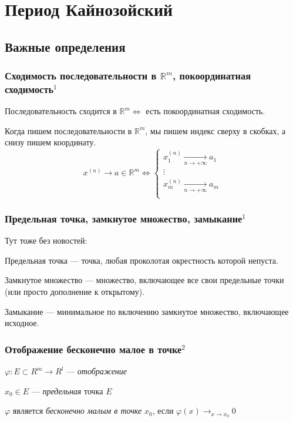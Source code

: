 \documentclass{article}
\begin{document}
\section{Период Кайнозойский}
\subsection{Важные определения}
\subsubsection{Сходимость последовательности в \texorpdfstring{$\mathbb{R}^m$}{R\^m}, покоординатная сходимость\texorpdfstring{$^1$}{}}
Последовательность сходится в $\mathbb{R}^m  \Leftrightarrow$ есть покоординатная сходимость.

Когда пишем последовательности в $\mathbb{R}^m$, мы пишем индекс сверху в скобках, а снизу пишем координату.
$$
x^{(n)} \rightarrow a \in \mathbb{R}^m \Leftrightarrow \left\{\begin{array}{c}
     x^{(n)}_1 \underset{n\rightarrow+\infty}{\longrightarrow} a_1 \\
     \vdots \\
     x^{(n)}_m \underset{n\rightarrow+\infty}{\longrightarrow} a_m \\
\end{array}\right.
$$

\subsubsection{Предельная точка, замкнутое множество, замыкание\texorpdfstring{$^1$}{}}
Тут тоже без новостей:

Предельная точка --- точка, любая проколотая окрестность которой непуста.

Замкнутое множество --- множество, включающее все свои предельные точки (или просто дополнение к открытому).

Замыкание --- минимальное по включению замкнутое множество, включающее исходное.

\subsubsection{Отображение бесконечно малое в точке\texorpdfstring{$^2$}{}}

$\varphi : E \subset R^m \rightarrow R^l$ --- \textit{отображение}

$x_0 \in E$ --- \textit{предельная} точка $E$

$\varphi$ является \textit{бесконечно малым в точке} $x_0$, если $\varphi(x) \rightarrow_{x \rightarrow x_0} 0$
\end{document}
